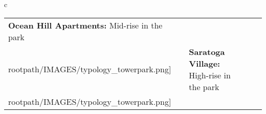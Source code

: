 \begin{table}[H]
        \begin{tabular}{c}
        \begin{tabular}{m{1.25in} m{2in} m{.1in} m{1.25in} m{2in}}
\textbf{Ocean Hill Apartments:} {Mid-rise in the park} & \texttt{[image: \\rootpath/IMAGES/typology\_towerpark.png]} & & \textbf{Saratoga Village:} {High-rise in the park} & \texttt{[image: \\rootpath/IMAGES/typology\_towerpark.png]}
\end{tabular}\end{tabular}
        \end{table}